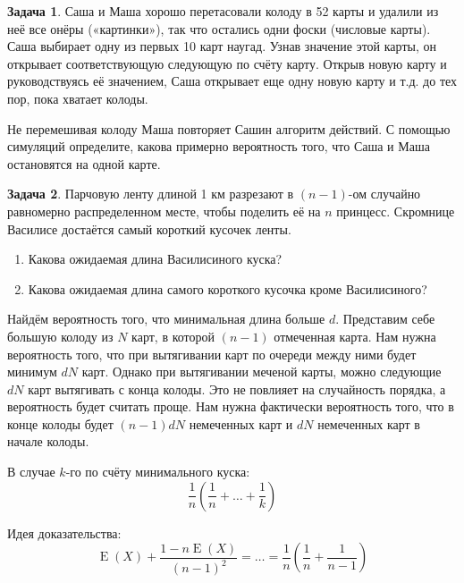 \documentclass[nobib]{tufte-handout}
\theoremstyle{definition}
\newtheorem{problem}{Задача}
\DeclareMathOperator{\E}{E}
\begin{document}
\begin{problem}
Саша и Маша хорошо перетасовали колоду в 52 карты и удалили из неё все онёры («картинки»), так что остались одни фоски (числовые карты). Саша выбирает одну из первых 10 карт наугад. Узнав значение этой карты, он открывает соответствующую следующую по счёту карту. Открыв новую карту и руководствуясь её значением, Саша открывает еще одну новую карту и т.д. до тех пор, пока хватает колоды.

Не перемешивая колоду Маша повторяет Сашин алгоритм действий. С помощью симуляций определите, какова примерно вероятность того, что Саша и Маша остановятся на одной карте.

\end{problem}


\begin{problem}
Парчовую ленту длиной 1 км разрезают в $(n-1)$-ом случайно равномерно распределенном месте, чтобы поделить её на $n$ принцесс. Скромнице Василисе достаётся самый короткий кусочек ленты.

\begin{enumerate}
\item Какова ожидаемая длина Василисиного куска?
\item Какова ожидаемая длина самого короткого кусочка кроме Василисиного?
\end{enumerate}

\begin{sol}
Найдём вероятность того, что минимальная длина больше $d$. Представим себе большую колоду из $N$ карт, в которой $(n-1)$ отмеченная карта. Нам нужна вероятность того, что при вытягивании карт по очереди между ними будет минимум $dN$ карт. Однако при вытягивании меченой карты, можно следующие $dN$ карт вытягивать с конца колоды. Это не повлияет на случайность порядка, а вероятность будет считать проще. Нам нужна фактически вероятность того, что в конце колоды будет $(n-1)dN$ немеченных карт и $dN$ немеченных карт в начале колоды.


В случае $k$-го по счёту минимального куска:
\[
\frac{1}{n}\left( \frac{1}{n} + \ldots + \frac{1}{k}\right)
\]

Идея доказательства:
\[
\E(X) + \frac{1-n\E(X)}{(n-1)^2}=\ldots=\frac{1}{n}\left( \frac{1}{n} + \frac{1}{n-1}\right)
\]
\end{sol}


\end{problem}
\end{document}
